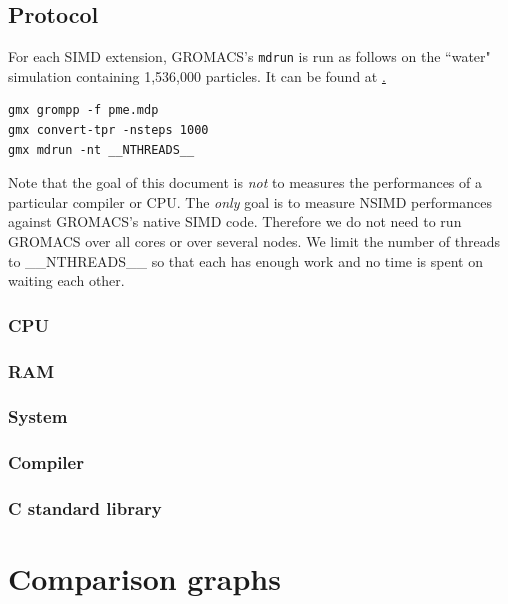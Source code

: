\documentclass[a4paper,11pt]{article}
\newcommand{\gromacs}{GROMACS}
\begin{document}
\subsection{Protocol}

For each SIMD extension, \gromacs{}'s \texttt{mdrun} is run as follows on
the ``water" simulation containing 1,536,000 particles. It can be found
at \href{https://ftp.gromacs.org/pub/benchmarks/water_GMX50_bare.tar.gz}.

\begin{lstlisting}
gmx grompp -f pme.mdp
gmx convert-tpr -nsteps 1000
gmx mdrun -nt __NTHREADS__
\end{lstlisting}

Note that the goal of this document is \emph{not} to measures the performances
of a particular compiler or CPU. The \emph{only} goal is to measure NSIMD
performances against \gromacs{}'s native SIMD code. Therefore we do not need
to run \gromacs{} over all cores or over several nodes. We limit the number
of threads to __NTHREADS__ so that each has enough work and no time is spent
on waiting each other.

\subsubsection{CPU}


\subsubsection{RAM}


\subsubsection{System}


\subsubsection{Compiler}


\subsubsection{C standard library}

 
\section{Comparison graphs}

\end{document}
